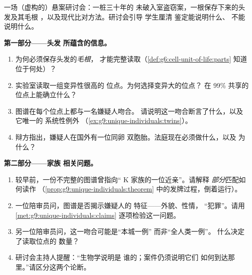 \begin{problem}\label{pb:g9:unique-individuals:1}
一场（虚构的）悬案研讨会：一桩三十年的
未破入室盗窃案，一根保存下来的头发及其毛根
，以及现代比对方法。研讨会引导
学生厘清  鉴定能说明什么、
不能说明什么。

\medskip\noindent\textbf{第一部分——头发
所蕴含的信息。}
\begin{enumerate}
  \item 为何必须保存头发的\emph{毛根}，
        才能完整读取（\cref{def:g6:cell-unit-of-life:parts}
        知道  位于何处）？
  \item 实验室读取一组变异性很高的
        位点。为何选择变异大的位点？
        在 99\% 共享的位点上能确立什么？
  \item 图谱在每个位点上都与一名嫌疑人吻合。
        请说明这一吻合断言了什么，以及它唯一的
        系统性例外
        （\cref{ex:g9:unique-individuals:twins}）。
  \item 辩方指出，嫌疑人在国外有一位同卵
        双胞胎。法庭现在必须做什么，以及
        为什么？
\end{enumerate}

\medskip\noindent\textbf{第二部分——家族
相关问题。}
\begin{enumerate}[resume]
  \item 较早前，一份不完整的图谱曾指向“
        K 家族的一位近亲”。请解释
        \emph{部分}匹配如何读作
        （\cref{prop:g9:unique-individuals:theorem}
        中的发牌过程，倒着运行）。
  \item 一位陪审员问，图谱是否揭示嫌疑人的
        特征——外貌、性情，
        “犯罪”。请用
        \cref{met:g9:unique-individuals:claims}
        逐项检验这一问题。
  \item 另一位陪审员问，这一吻合可能是“本城一例”
        而非“全人类一例”。
        什么决定了读取位点的
        数量？
  \item 研讨会主持人提醒：“生物学说明是
        谁的；案件仍须说明它们
        如何到达那里。”请区分这两个论断。
\end{enumerate}


\end{problem}
